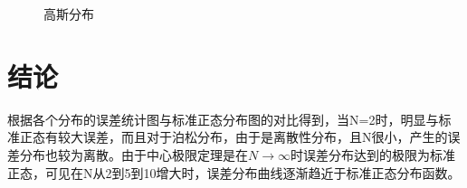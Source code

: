 \documentclass{article}
\begin{document}
\begin{figure}[!h]
	\centering
	\caption{\heiti{}高斯分布}
	
\end{figure}
	\section{结论}
根据各个分布的误差统计图与标准正态分布图的对比得到，当N=2时，明显与标准正态有较大误差，而且对于泊松分布，由于是离散性分布，且N很小，产生的误差分布也较为离散。由于中心极限定理是在$ N\rightarrow\infty $时误差分布达到的极限为标准正态，可见在N从2到5到10增大时，误差分布曲线逐渐趋近于标准正态分布函数。
\end{document}
